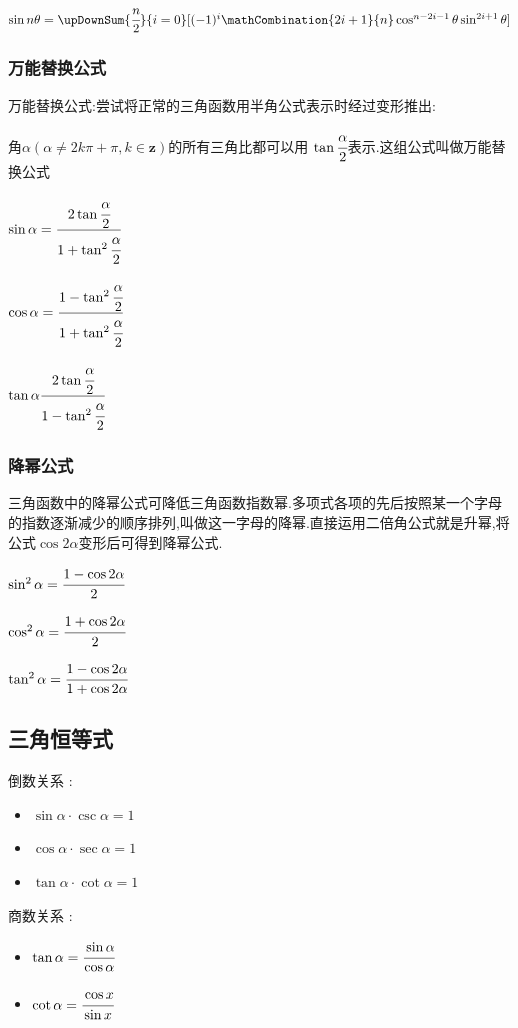 {{{    $\sin{n\theta} = \upDownSum{\cfrac{n}{2}}{i = 0}[(-1)^i\mathCombination{2i + 1}{n}\cos^{n - 2i - 1}\theta\sin^{2i+1}\theta]$
  }%

  \subsubsection{万能替换公式}{
    万能替换公式:尝试将正常的三角函数用半角公式表示时经过变形推出:

    角$\alpha(\alpha \neq 2k\pi + \pi ,k \in \mathbf{z})$的所有三角比都可以用 $\tan\cfrac{\alpha}{2}$表示.这组公式叫做万能替换公式

    $\sin\alpha = \cfrac{2\tan\cfrac{\alpha}{2}}{1+\tan^2\cfrac{\alpha}{2}}$

    $\cos\alpha = \cfrac{1 - \tan^2\cfrac{\alpha}{2}}{1 + \tan^2\cfrac{\alpha}{2}}$

    $\tan\alpha \cfrac{2\tan\cfrac{\alpha}{2}}{1 - \tan^2\cfrac{\alpha}{2}}$
  }%

  \subsubsection{降幂公式}{
    三角函数中的降幂公式可降低三角函数指数幂.多项式各项的先后按照某一个字母的指数逐渐减少的顺序排列,叫做这一字母的降幂.直接运用二倍角公式就是升幂,将公式$\cos 2 \alpha$变形后可得到降幂公式.

    $\sin^2\alpha = \cfrac{1 - \cos2\alpha}{2}$

    $\cos^2\alpha = \cfrac{1 + \cos2\alpha}{2}$

    $\tan^2\alpha = \cfrac{1 - \cos2\alpha}{1 + \cos2\alpha}$
  }%

}%

\subsection{三角恒等式}{

  倒数关系 :
  \begin{itemize}
    \item $\sin\alpha \cdot \csc\alpha = 1$
    \item $\cos\alpha \cdot \sec\alpha = 1$
    \item $\tan\alpha \cdot \cot\alpha = 1$
  \end{itemize}

  商数关系 :
  \begin{itemize}
    \item $\tan\alpha = \cfrac{\sin\alpha}{\cos\alpha}$
    \item $\cot\alpha = \cfrac{\cos x}{\sin x}$
  \end{itemize}

}}
